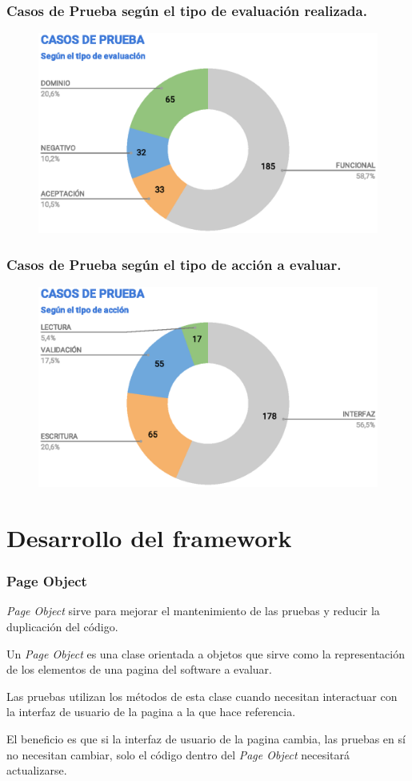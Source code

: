 \documentclass{beamer}
\begin{document}
\begin{frame}
\frametitle{Casos de Prueba según el tipo de evaluación realizada.}
\begin{figure}
\centering
\includegraphics[width=1.0\textwidth]{graphics/tc-tests.eps}
\end{figure}
\end{frame}

\begin{frame}
\frametitle{Casos de Prueba según el tipo de acción a evaluar.}
\begin{figure}
\centering
\includegraphics[width=1.0\textwidth]{graphics/tc-type.eps}
\end{figure}
\end{frame}

\section{Desarrollo del framework}

\begin{frame}
\frametitle{Page Object}
\emph{Page Object} sirve para mejorar el mantenimiento de las pruebas y reducir
la duplicación del código.

Un \emph{Page Object} es una clase orientada a
objetos que sirve como la representación de los elementos de una pagina del
software a evaluar.

Las pruebas utilizan los métodos de esta clase cuando
necesitan interactuar con la interfaz de usuario de la pagina a la que hace
referencia.

El beneficio es que si la interfaz de usuario de la pagina cambia,
las pruebas en sí no necesitan cambiar, solo el código dentro del
\emph{Page Object} necesitará actualizarse.
\end{frame}
\end{document}
